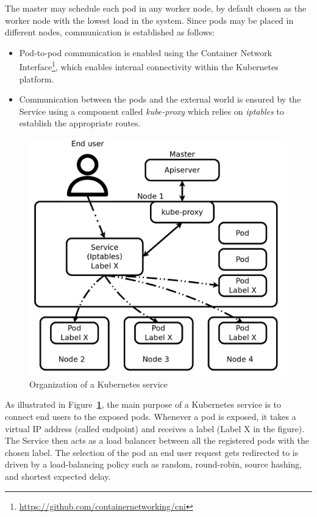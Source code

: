 \documentclass[letterpaper,twocolumn,10pt]{article}
\let\origref\ref
\def\ref#1{\textbf{\origref{#1}}}
\begin{document}
The master may schedule each pod in any worker node, by default chosen
as the worker node with the lowest load in the system. Since pods may
be placed in different nodes, communication is established as follows:

\begin{itemize}
\item Pod-to-pod communication is enabled using the Container Network
  Interface\footnote{\url{https://github.com/containernetworking/cni}},
  which enables internal connectivity within the Kubernetes platform.
\item Communication between the pods and the external world is ensured
  by the Service using a component called \emph{kube-proxy} which
  relies on \emph{iptables} to establish the appropriate routes.
\end{itemize}

\begin{figure}[t]
  \centering
  \includegraphics[width=.9\linewidth]{images/svc.png}
  \caption{Organization of a Kubernetes service}
  \label{fig:svc}
\end{figure}

As illustrated in Figure~\ref{fig:svc}, the main purpose of a
Kubernetes service is to connect end users to the exposed
pods. Whenever a pod is exposed, it takes a virtual IP address (called
endpoint) and receives a label (Label X in the figure). The Service
then acts as a load balancer between all the registered pods with the
chosen label. The selection of the pod an end user request gets
redirected to is driven by a load-balancing policy such as random,
round-robin, source hashing, and shortest expected delay.
\end{document}
